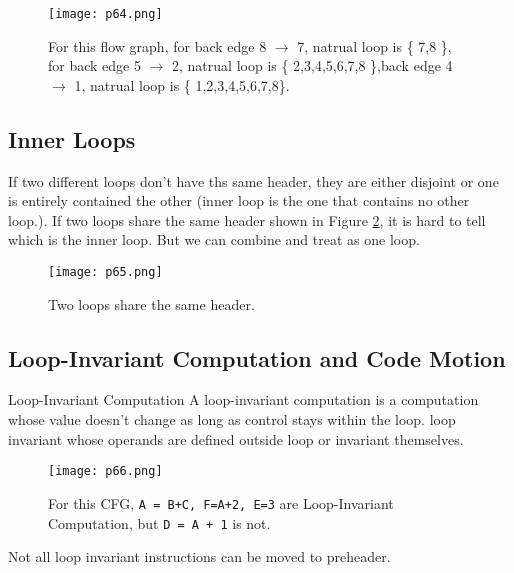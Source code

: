 \begin{figure}[H]
    \centering
     \texttt{[image: p64.png]}
         \caption{For this flow graph, for back edge 8 $\rightarrow$ 7, natrual loop is \{ 7,8 \}, for back edge 5 $\rightarrow$ 2, natrual loop is \{ 2,3,4,5,6,7,8 \},back edge 4 $\rightarrow$ 1, natrual loop is \{ 1,2,3,4,5,6,7,8\}.}
         \label{fig:p64}
\end{figure}

\subsection{Inner Loops}

If two different loops don't have ths same header, they are either disjoint or one is entirely contained the other (inner loop is the one that contains no other loop.).
If two loops share the same header shown in Figure \ref{fig:p65}, it is hard to tell which is the inner loop. But we can combine and treat as one loop.


\begin{figure}[H]
    \centering
     \texttt{[image: p65.png]}
         \caption{Two loops share the same header.}
         \label{fig:p65}
\end{figure}






\subsection{Loop-Invariant Computation and Code Motion}

\begin{definition}{Loop-Invariant Computation}
    A loop-invariant computation is a computation whose value doesn't change as long as control stays within the loop. 
    loop invariant whose operands are defined outside loop or invariant themselves.
\end{definition}


\begin{figure}[H]
    \centering
     \texttt{[image: p66.png]}
         \caption{For this CFG, \texttt{A = B+C, F=A+2, E=3} are Loop-Invariant Computation, but \texttt{D = A + 1} is not. }
         \label{fig:p66}
\end{figure}



Not all loop invariant instructions can be moved to preheader.


